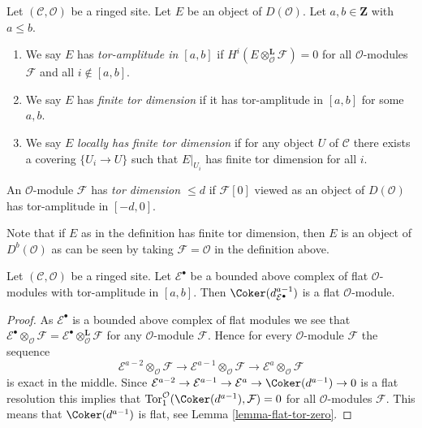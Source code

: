 \begin{definition}
\label{definition-tor-amplitude}
Let $(\mathcal{C}, \mathcal{O})$ be a ringed site.
Let $E$ be an object of $D(\mathcal{O})$.
Let $a, b \in \mathbf{Z}$ with $a \leq b$.
\begin{enumerate}
\item We say $E$ has {\it tor-amplitude in $[a, b]$}
if $H^i(E \otimes_\mathcal{O}^\mathbf{L} \mathcal{F}) = 0$
for all $\mathcal{O}$-modules $\mathcal{F}$ and all $i \not \in [a, b]$.
\item We say $E$ has {\it finite tor dimension}
if it has tor-amplitude in $[a, b]$ for some $a, b$.
\item We say $E$ {\it locally has finite tor dimension} if for any
object $U$ of $\mathcal{C}$ there exists a covering $\{U_i \to U\}$
such that $E|_{U_i}$ has finite tor dimension for all $i$.
\end{enumerate}
An $\mathcal{O}$-module $\mathcal{F}$ has {\it tor dimension $\leq d$}
if $\mathcal{F}[0]$ viewed as an object of $D(\mathcal{O})$ has
tor-amplitude in $[-d, 0]$.
\end{definition}

\noindent
Note that if $E$ as in the definition
has finite tor dimension, then $E$ is an object of
$D^b(\mathcal{O})$ as can be seen by taking $\mathcal{F} = \mathcal{O}$
in the definition above.

\begin{lemma}
\label{lemma-last-one-flat}
Let $(\mathcal{C}, \mathcal{O})$ be a ringed site.
Let $\mathcal{E}^\bullet$ be a bounded above complex of flat
$\mathcal{O}$-modules with tor-amplitude in $[a, b]$.
Then $\Coker(d_{\mathcal{E}^\bullet}^{a - 1})$ is a flat
$\mathcal{O}$-module.
\end{lemma}

\begin{proof}
As $\mathcal{E}^\bullet$ is a bounded above complex of flat modules we see that
$\mathcal{E}^\bullet \otimes_\mathcal{O} \mathcal{F} =
\mathcal{E}^\bullet \otimes_\mathcal{O}^{\mathbf{L}} \mathcal{F}$
for any $\mathcal{O}$-module $\mathcal{F}$.
Hence for every $\mathcal{O}$-module $\mathcal{F}$ the sequence
$$
\mathcal{E}^{a - 2} \otimes_\mathcal{O} \mathcal{F} \to
\mathcal{E}^{a - 1} \otimes_\mathcal{O} \mathcal{F} \to
\mathcal{E}^a \otimes_\mathcal{O} \mathcal{F}
$$
is exact in the middle. Since
$\mathcal{E}^{a - 2} \to \mathcal{E}^{a - 1} \to \mathcal{E}^a \to
\Coker(d^{a - 1}) \to 0$
is a flat resolution this implies that
$\text{Tor}_1^\mathcal{O}(\Coker(d^{a - 1}), \mathcal{F}) = 0$
for all $\mathcal{O}$-modules $\mathcal{F}$. This means that
$\Coker(d^{a - 1})$ is flat, see Lemma \ref{lemma-flat-tor-zero}.
\end{proof}

